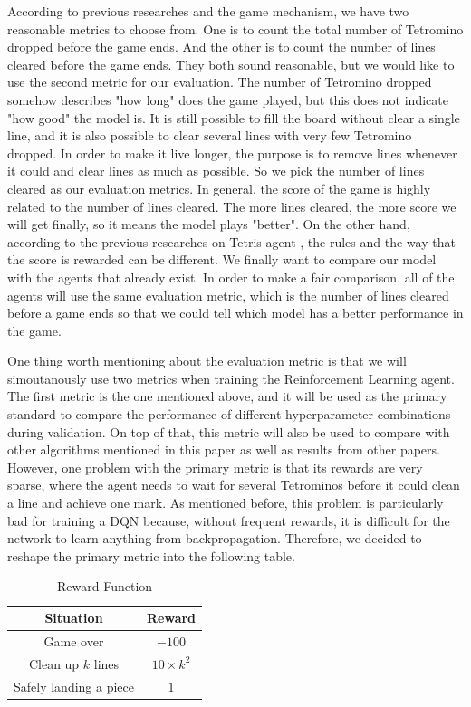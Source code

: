 \documentclass[letterpaper]{article} %
\begin{document}
According to previous researches and the game mechanism, we have two reasonable metrics to choose from. One is to count the total number of Tetromino dropped before the game ends. And the other is to count the number of lines cleared before the game ends. They both sound reasonable, but we would like to use the second metric for our evaluation. The number of Tetromino dropped somehow describes "how long" does the game played, but this does not indicate "how good" the model is. It is still possible to fill the board without clear a single line, and it is also possible to clear several lines with very few Tetromino dropped. In order to make it live longer, the purpose is to remove lines whenever it could and clear lines as much as possible. So we pick the number of lines cleared as our evaluation metrics. In general, the score of the game is highly related to the number of lines cleared. The more lines cleared, the more score we will get finally, so it means the model plays "better". On the other hand, according to the previous researches on Tetris agent \cite{SO19}, the rules and the way that the score is rewarded can be different. We finally want to compare our model with the agents that already exist. In order to make a fair comparison, all of the agents will use the same evaluation metric, which is the number of lines cleared before a game ends so that we could tell which model has a better performance in the game.

One thing worth mentioning about the evaluation metric is that we will simoutanously use two metrics when training the Reinforcement Learning agent. The first metric is the one mentioned above, and it will be used as the primary standard to compare the performance of different hyperparameter combinations during validation. On top of that, this metric will also be used to compare with other algorithms mentioned in this paper as well as results from other papers. However, one problem with the primary metric is that its rewards are very sparse, where the agent needs to wait for several Tetrominos before it could clean a line and achieve one mark. As mentioned before, this problem is particularly bad for training a DQN because, without frequent rewards, it is difficult for the network to learn anything from backpropagation. Therefore, we decided to reshape the primary metric into the following table.

\begin{table}[h!]
  \centering
  \normalsize{
    \begin{tabular}{ |c|c| } 
      \hline
      Situation & Reward  \\ 
      \hline
       Game over & $-100$  \\ 
       \hline
       Clean up $k$ lines & $10\times k^{2}$  \\ 
       \hline
       Safely landing a piece & $1$  \\
       \hline
      \end{tabular}}
  \caption{Reward Function}
  \label{tab:reward}
\end{table} 
\end{document}
